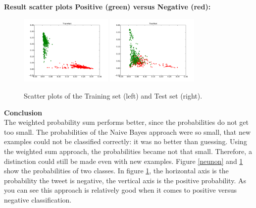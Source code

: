\documentclass[11pt]{article}
\begin{document}
\textbf{Result scatter plots Positive (green) versus Negative (red):}
\begin{figure}[!h]
\centering
\includegraphics[width=0.4\textwidth]{PosNegScatter1.pdf}
\includegraphics[width=0.4\textwidth]{PosNegScatter2.pdf}
\caption{Scatter plots of the Training set (left) and Test set (right).}
\label{posneg}
\end{figure}

\noindent\textbf{Conclusion}\\
The weighted probability sum performs better, since the probabilities do not get too small. The probabilities of the Naive Bayes approach were so small, that new examples could not be classified correctly: it was no better than guessing. Using the weighted sum approach, the probabilities became not that small. Therefore, a distinction could still be made even with new examples. Figure \ref{neunon} and \ref{posneg} show the probabilities of two classes. In figure \ref{posneg}, the horizontal axis is the probability the tweet is negative, the vertical axis is the positive probability. As you can see this approach is relatively good when it comes to positive versus negative classification.
\end{document}
